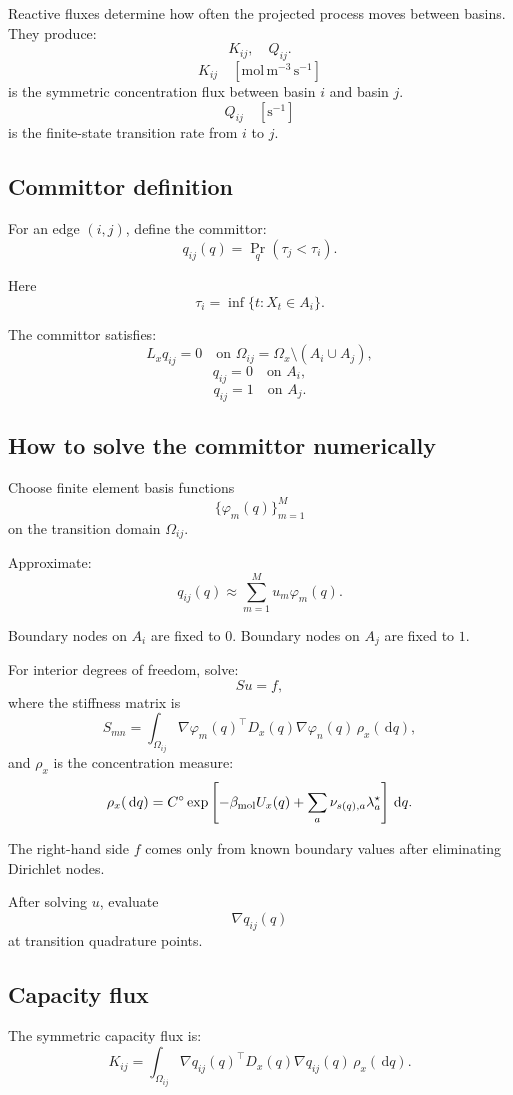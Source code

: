 \documentclass[11pt]{article}
\newcommand{\dd}{\,\mathrm d}
\begin{document}
Reactive fluxes determine how often the projected process moves between basins.
They produce:
\[
K_{ij},\quad Q_{ij}.
\]
\[
K_{ij}
\quad [\mathrm{mol\,m^{-3}\,s^{-1}}]
\]
is the symmetric concentration flux between basin \(i\) and basin \(j\).
\[
Q_{ij}
\quad [\mathrm{s^{-1}}]
\]
is the finite-state transition rate from \(i\) to \(j\).

\subsection{Committor definition}

For an edge \((i,j)\), define the committor:
\[
q_{ij}(q)
=
\Pr_q(\tau_j<\tau_i).
\]

Here
\[
\tau_i=\inf\{t:X_t\in A_i\}.
\]

The committor satisfies:
\[
L_x q_{ij}=0
\quad
\text{on }\Omega_{ij}=\Omega_x\setminus(A_i\cup A_j),
\]
\[
q_{ij}=0
\quad
\text{on }A_i,
\]
\[
q_{ij}=1
\quad
\text{on }A_j.
\]

\subsection{How to solve the committor numerically}

Choose finite element basis functions
\[
\{\varphi_m(q)\}_{m=1}^{M}
\]
on the transition domain \(\Omega_{ij}\).

Approximate:
\[
q_{ij}(q)\approx \sum_{m=1}^{M}u_m\varphi_m(q).
\]

Boundary nodes on \(A_i\) are fixed to \(0\).
Boundary nodes on \(A_j\) are fixed to \(1\).

For interior degrees of freedom, solve:
\[
S u = f,
\]
where the stiffness matrix is
\[
S_{mn}
=
\int_{\Omega_{ij}}
\nabla\varphi_m(q)^\top
D_x(q)
\nabla\varphi_n(q)
\,\rho_x(\dd q),
\]
and \(\rho_x\) is the concentration measure:
\[
\rho_x(\dd q)
=
C^\circ
\exp
\left[
-\beta_{\rm mol}U_x(q)
+
\sum_a\nu_{s(q),a}\lambda_a^\star
\right]\dd q.
\]

The right-hand side \(f\) comes only from known boundary values after
eliminating Dirichlet nodes.

After solving \(u\), evaluate
\[
\nabla q_{ij}(q)
\]
at transition quadrature points.

\subsection{Capacity flux}

The symmetric capacity flux is:
\[
K_{ij}
=
\int_{\Omega_{ij}}
\nabla q_{ij}(q)^\top
D_x(q)
\nabla q_{ij}(q)\,
\rho_x(\dd q).
\]
\end{document}

